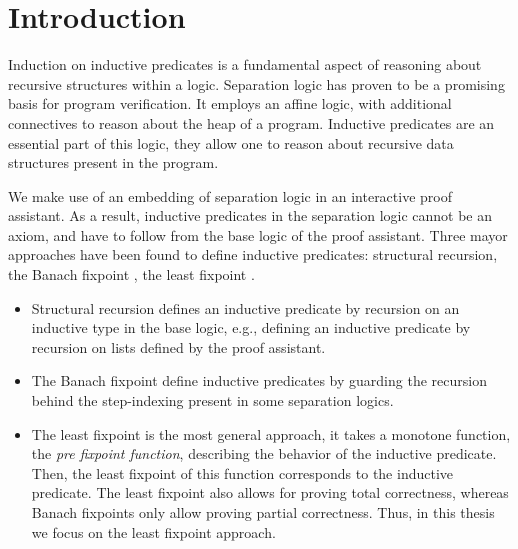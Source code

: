 \documentclass[thesis.tex]{subfiles}
\begin{document}
\chapter{Introduction}
\label{ch:introduction}

Induction on inductive predicates is a fundamental aspect of reasoning about recursive structures within a logic. Separation logic \cite{ohearnLocalReasoningPrograms2001,reynoldsSeparationLogicLogic2002b} has proven to be a promising basis for program verification. It employs an affine logic, with additional connectives to reason about the heap of a program. Inductive predicates are an essential part of this logic, they allow one to reason about recursive data structures present in the program.

We make use of an embedding of separation logic in an interactive proof assistant. As a result, inductive predicates in the separation logic cannot be an axiom, and have to follow from the base logic of the proof assistant. Three mayor approaches have been found to define inductive predicates: structural recursion, the Banach fixpoint \cite{jungIrisGroundModular2018}, the least fixpoint \cite{appelProgramLogicsCertified2014}.
\begin{itemize}
  \item Structural recursion defines an inductive predicate by recursion on an inductive type in the base logic, e.g., defining an inductive predicate by recursion on lists defined by the proof assistant.
  \item The Banach fixpoint define inductive predicates by guarding the recursion behind the step-indexing present in some separation logics.
  \item The least fixpoint is the most general approach, it takes a monotone function, the \emph{pre fixpoint function}, describing the behavior of the inductive predicate. Then, the least fixpoint of this function corresponds to the inductive predicate. The least fixpoint also allows for proving total correctness, whereas Banach fixpoints only allow proving partial correctness. Thus, in this thesis we focus on the least fixpoint approach.
\end{itemize}
\end{document}
